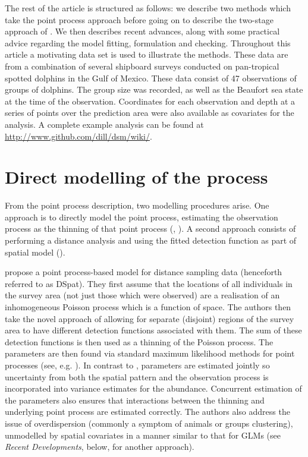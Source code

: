 \documentclass[a4paper,12pt]{article}
\begin{document}
The rest of the article is structured as follows: we describe two methods which take the point process approach before going on to describe the two-stage approach of \cite{Hedley:2004et}. We then describes recent advances, along with some practical advice regarding the model fitting, formulation and checking. Throughout this article a motivating data set is used to illustrate the methods. These data are from a combination of several shipboard surveys conducted on pan-tropical spotted dolphins in the Gulf of Mexico. These data consist of 47 observations of groups of dolphins. The group size was recorded, as well as the Beaufort sea state at the time of the observation. Coordinates for each observation and depth at a series of points over the prediction area were also available as covariates for the analysis. A complete example analysis can be found at \url{http://www.github.com/dill/dsm/wiki/}.

\section*{Direct modelling of the process}
\label{s:direct}

From the point process description, two modelling procedures arise. One approach is to directly model the point process, estimating the observation process as the thinning of that point process (\cite{Niemi:2010kx}, \cite{Johnson:2010gf}). A second approach consists of performing a distance analysis and using the fitted detection function as part of spatial model (\cite{Hedley:2004et}).

\cite{Johnson:2010gf} propose a point process-based model for distance sampling data (henceforth referred to as DSpat). They first assume that the locations of all individuals in the survey area (not just those which were observed) are a realisation of an inhomogeneous Poisson process which is a function of space. The authors then take the novel approach of allowing for separate (disjoint) regions of the survey area to have different detection functions associated with them. The sum of these detection functions is then used as a thinning of the Poisson process. The parameters are then found via standard maximum likelihood methods for point processes (see, e.g. \cite{Baddeley:2000to}). In contrast to \cite{Hedley:2004et}, parameters are estimated jointly so uncertainty from both the spatial pattern and the observation process is incorporated into variance estimates for the abundance. Concurrent estimation of the parameters also ensures that interactions between the thinning and underlying point process are estimated correctly. The authors also address the issue of overdispersion (commonly a symptom of animals or groups clustering), unmodelled by spatial covariates in a manner similar to that for GLMs (see \textit{Recent Developments}, below, for another approach). 
\end{document}
